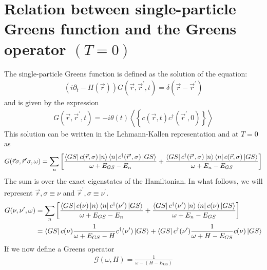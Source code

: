 \documentclass[prb]{revtex4-2}
\begin{document}
\section{Relation between single-particle Greens function and the Greens operator $(T=0)$}
 The single-particle Greens function is defined as the solution of the equation:
 \begin{equation}\begin{aligned}
	 \left(i\partial_t - H(\vec r)\right)G(\vec r,\vec r^\prime, t) = \delta(\vec r - \vec r^\prime)
 \end{aligned}\end{equation}
 and is given by the expression
 \begin{equation}\begin{aligned}
	 G(\vec r,\vec r^\prime, t) = -i \theta(t) \left< \left\{ c(\vec r, t) c^\dagger(\vec r^\prime, 0)\right\} \right>
 \end{aligned}\end{equation}
 This solution can be written in the Lehmann-Kallen representation  and at $T=0$ as
 \begin{equation}\begin{aligned}
	 G(\vec r \sigma, \vec r^\prime \sigma, \omega) = \sum_{n}\left[\frac{\bra{GS}c({\vec r,\sigma})\ket{n}\bra{n}c^\dagger(\vec r^\prime,\sigma)\ket{GS}}{\omega + E_{GS} - E_n} + \frac{\bra{GS}c^\dagger(\vec r^\prime,\sigma)\ket{n}\bra{n}c({\vec r,\sigma})\ket{GS}}{\omega + E_n - E_{GS}}\right]
 \end{aligned}\end{equation}
 The sum is over the exact eigenstates of the Hamiltonian. In what follows, we will represent $\vec r,\sigma \equiv \nu$ and $\vec r^\prime,\sigma \equiv \nu^\prime$.
 \begin{equation}\begin{aligned}
	 G(\nu, \nu^\prime, \omega) &= \sum_{n}\left[\frac{\bra{GS}c(\nu)\ket{n}\bra{n}c^\dagger(\nu^\prime)\ket{GS}}{\omega + E_{GS} - E_n} + \frac{\bra{GS}c^\dagger(\nu^\prime)\ket{n}\bra{n}c(\nu)\ket{GS}}{\omega + E_n - E_{GS}}\right]\\
							&= \bra{GS}c(\nu)\frac{1}{\omega + E_{GS} - H}c^\dagger(\nu^\prime)\ket{GS} + \bra{GS}c^\dagger(\nu^\prime)\frac{1}{\omega + H - E_{GS}}c(\nu)\ket{GS}\\
 \end{aligned}\end{equation}
 If we now define a Greens operator
 \begin{equation}\begin{aligned}
	 \label{inv_G_func}
	 \mathcal{G}(\omega, H) = \frac{1}{\omega - (H - E_\text{GS})}
 \end{aligned}\end{equation}
\end{document}

